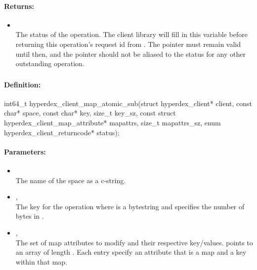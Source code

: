 \paragraph{Returns:}
\begin{itemize}[noitemsep]
\item {}\\
The status of the operation.  The client library will fill in this variable before returning this operation's request id from .  The pointer must remain valid until then, and the pointer should not be aliased to the status for any other outstanding operation.
\end{itemize}

\pagebreak
\subsubsection{}
\label{api:c:map_atomic_sub}


\paragraph{Definition:}
\begin{ccode}
int64_t hyperdex_client_map_atomic_sub(struct hyperdex_client* client,
        const char* space,
        const char* key, size_t key_sz,
        const struct hyperdex_client_map_attribute* mapattrs, size_t mapattrs_sz,
        enum hyperdex_client_returncode* status);
\end{ccode}

\paragraph{Parameters:}
\begin{itemize}[noitemsep]
\item {}\\
The name of the space as a c-string.
\item {}, \\
The key for the operation where  is a bytestring and  specifies the number of bytes in .
\item {}, \\
The set of map attributes to modify and their respective key/values.   points to an array of length .  Each entry specify an attribute that is a map and a key within that map.
\end{itemize}

